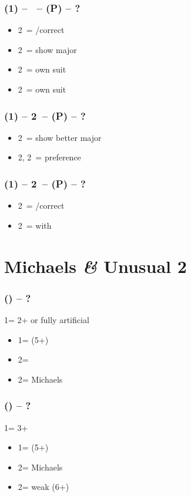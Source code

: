 \subsubsection*{(1\ntx) -- \dbl\ -- (P) -- ?}
\begin{itemize}
    \item 2\clubs\ = \pass/correct
    \item 2\diams\ = show major
    \item 2\hearts\ = own suit
    \item 2\spades\ = own suit
\end{itemize}

\subsubsection*{(1\ntx) -- 2\clubs\ -- (P) -- ?}
\begin{itemize}
    \item 2\diams\ = show better major
    \item 2\hearts, 2\spades\ = preference
\end{itemize}

\subsubsection*{(1\ntx) -- 2\diams\ -- (P) -- ?}
\begin{itemize}
    \item 2\hearts\ = \pass/correct
    \item 2\spades\ = \inv with \hearts
\end{itemize}

\section{\texorpdfstring{Michaels \textit{\&} Unusual 2\nt}{michaels&unusual2nt}}\label{sec:michaels&unusual2nt}

\subsubsection*{(\alrts{1\clubs}) -- ?}
1\clubs = 2+ or fully artificial
\begin{itemize}
    \item 1\diams = \nat (5+)
    \item 2\clubs = \nat
    \item 2\diams = Michaels
\end{itemize}

\subsubsection*{(\alrts{1\clubs}) -- ?}
1\clubs = 3+
\begin{itemize}
    \item 1\diams = \nat (5+)
    \item 2\clubs = Michaels
    \item 2\diams = weak (6+)
\end{itemize}

